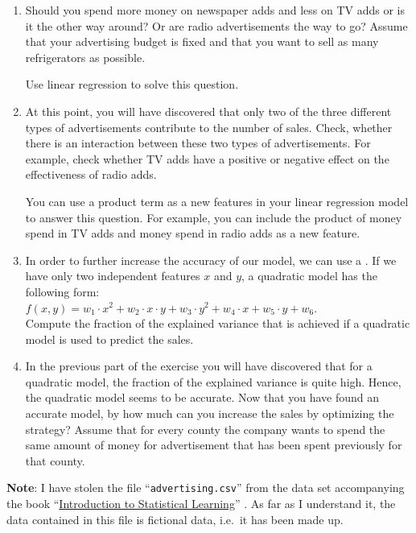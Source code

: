 \begin{enumerate}
\item Should you spend more money on newspaper adds and less on TV adds or is it the other way around?  Or are radio
      advertisements the way to go? Assume that your advertising budget is fixed and that you want to sell as many
      refrigerators as possible.  

      Use linear regression to solve this question.
\item At this point, you will have discovered that only two of the three different types of advertisements 
      contribute to the number of sales.  Check, whether there is an interaction between these two types of
      advertisements.  For example, check whether TV adds have a positive or negative effect on the
      effectiveness of radio adds. 

      You can use a product term as a new features in your linear regression model to answer this question.
      For example, you can include the product of money spend in TV adds and money spend in radio adds as a new
      feature.
\item In order to further increase the accuracy of our model, we can use a .
      If we have only two independent features $x$ and $y$, a quadratic model has the following form:
      \\[0.2cm]
      \hspace*{1.3cm}
      $f(x,y) = w_1 \cdot x^2 + w_2 \cdot x \cdot y + w_3 \cdot y^2 + w_4 \cdot x + w_5 \cdot y + w_6$.
      \\[0.2cm]
      Compute the fraction of the explained variance that is achieved if a quadratic model is used to predict
      the sales.
\item In the previous part of the exercise you will have discovered that for a quadratic model, the fraction of
      the explained variance is quite high.  Hence, the quadratic model seems to be accurate.  Now that you
      have found an accurate model, by how much can you increase the sales by optimizing the strategy?
      Assume that for every county the company wants to spend the same amount of money for advertisement that
      has been spent previously for that county.  
\end{enumerate}
\vspace*{0.2cm}

\noindent
\textbf{Note}:  I have stolen the file ``\texttt{advertising.csv}'' from the data set accompanying the book
``\href{http://www-bcf.usc.edu/~gareth/ISL/index.html}{Introduction to Statistical Learning}''
\cite{james:2014}.  As far as I understand it, the data contained in this file is fictional data, i.e.~it
has been made up. 
\eox


